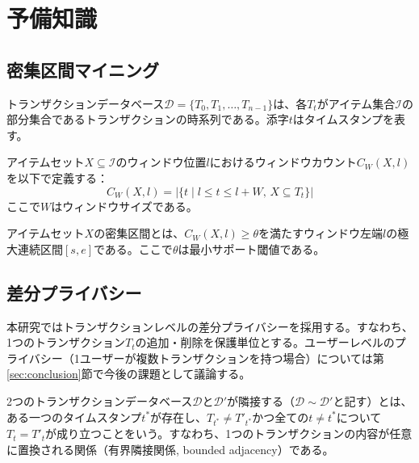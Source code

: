 \section{予備知識}\label{sec:preliminaries}

\subsection{密集区間マイニング}

\begin{definition}[トランザクションデータベース]
トランザクションデータベース$\mathcal{D} = \{T_0, T_1, \ldots, T_{n-1}\}$は、各$T_t$がアイテム集合$\mathcal{I}$の部分集合であるトランザクションの時系列である。添字$t$はタイムスタンプを表す。
\end{definition}

\begin{definition}[ウィンドウカウント]
アイテムセット$X \subseteq \mathcal{I}$のウィンドウ位置$l$におけるウィンドウカウント$C_W(X, l)$を以下で定義する：
\[
C_W(X, l) = |\{t \mid l \leq t \leq l + W,\, X \subseteq T_t\}|
\]
ここで$W$はウィンドウサイズである。
\end{definition}

\begin{definition}
アイテムセット$X$の密集区間とは、$C_W(X, l) \geq \theta$を満たすウィンドウ左端$l$の極大連続区間$[s, e]$である。ここで$\theta$は最小サポート閾値である。
\end{definition}

\subsection{差分プライバシー}

本研究ではトランザクションレベルの差分プライバシーを採用する。すなわち、1つのトランザクション$T_t$の追加・削除を保護単位とする。ユーザーレベルのプライバシー（1ユーザーが複数トランザクションを持つ場合）については第\ref{sec:conclusion}節で今後の課題として議論する。

\begin{definition}\label{def:adjacency}
2つのトランザクションデータベース$\mathcal{D}$と$\mathcal{D}'$が隣接する（$\mathcal{D} \sim \mathcal{D}'$と記す）とは、ある一つのタイムスタンプ$t^*$が存在し、$T_{t^*} \neq T'_{t^*}$かつ全ての$t \neq t^*$について$T_t = T'_t$が成り立つことをいう。すなわち、1つのトランザクションの内容が任意に置換される関係（有界隣接関係, bounded adjacency）である。
\end{definition}

